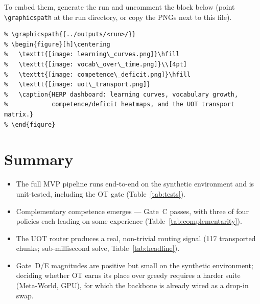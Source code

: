 \documentclass[11pt]{article}
\newcommand{\code}[1]{\texttt{#1}}
\begin{document}
To embed them, generate the run and uncomment the block below (point
\code{\textbackslash graphicspath} at the run directory, or copy the PNGs next
to this file).

\begin{verbatim}
% \graphicspath{{../outputs/<run>/}}
% \begin{figure}[h]\centering
%   \texttt{[image: learning\_curves.png]}\hfill
%   \texttt{[image: vocab\_over\_time.png]}\\[4pt]
%   \texttt{[image: competence\_deficit.png]}\hfill
%   \texttt{[image: uot\_transport.png]}
%   \caption{HERP dashboard: learning curves, vocabulary growth,
%            competence/deficit heatmaps, and the UOT transport matrix.}
% \end{figure}
\end{verbatim}

\section{Summary}
\begin{itemize}\itemsep2pt
  \item The full MVP pipeline runs end-to-end on the synthetic environment and
        is unit-tested, including the OT gate (Table~\ref{tab:tests}).
  \item Complementary competence emerges --- Gate~C passes, with three of four
        policies each leading on some experience (Table~\ref{tab:complementarity}).
  \item The UOT router produces a real, non-trivial routing signal (117
        transported chunks; sub-millisecond solve, Table~\ref{tab:headline}).
  \item Gate~D/E magnitudes are positive but small on the synthetic
        environment; deciding whether OT earns its place over greedy requires a
        harder suite (Meta-World, GPU), for which the backbone is already
        wired as a drop-in swap.
\end{itemize}
\end{document}
